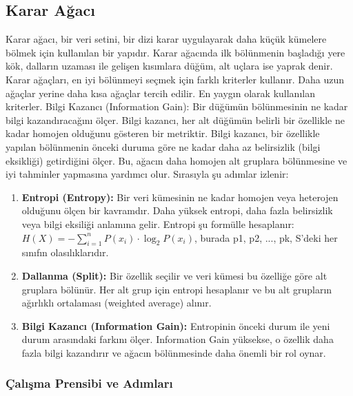 \subsection{Karar Ağacı}
Karar ağacı, bir veri setini, bir dizi karar uygulayarak daha küçük kümelere bölmek için kullanılan bir yapıdır. Karar ağacında ilk bölünmenin başladığı yere kök, dalların uzaması ile gelişen kısımlara düğüm, alt uçlara ise yaprak denir. Karar ağaçları, en iyi bölünmeyi seçmek için farklı kriterler kullanır. Daha uzun ağaçlar yerine daha kısa ağaçlar tercih edilir. En yaygın olarak kullanılan kriterler.
Bilgi Kazancı (Information Gain): Bir düğümün bölünmesinin ne kadar bilgi kazandıracağını ölçer. Bilgi kazancı, her alt düğümün belirli bir özellikle ne kadar homojen olduğunu gösteren bir metriktir. Bilgi kazancı, bir özellikle yapılan bölünmenin önceki duruma göre ne kadar daha az belirsizlik (bilgi eksikliği) getirdiğini ölçer. Bu, ağacın daha homojen alt gruplara bölünmesine ve iyi tahminler yapmasına yardımcı olur. Sırasıyla şu adımlar izlenir:
\begin{enumerate}
\item \textbf{Entropi (Entropy):} Bir veri kümesinin ne kadar homojen veya heterojen olduğunu ölçen bir kavramdır. Daha yüksek entropi, daha fazla belirsizlik veya bilgi eksiliği anlamına gelir. Entropi şu formülle hesaplanır: \\ $H(X) = - \sum_{i=1}^{n} P(x_i) \cdot \log_{2} P(x_i)$, burada p1, p2, ..., pk, S'deki her sınıfın olasılıklarıdır.
\item \textbf{Dallanma (Split):} Bir özellik seçilir ve veri kümesi bu özelliğe göre alt gruplara bölünür. Her alt grup için entropi hesaplanır ve bu alt grupların ağırlıklı ortalaması (weighted average) alınır.
\item \textbf{Bilgi Kazancı (Information Gain):} Entropinin önceki durum ile yeni durum arasındaki farkını ölçer. Information Gain yüksekse, o özellik daha fazla bilgi kazandırır ve ağacın bölünmesinde daha önemli bir rol oynar.
\end{enumerate}

\subsubsection{Çalışma Prensibi ve Adımları}

